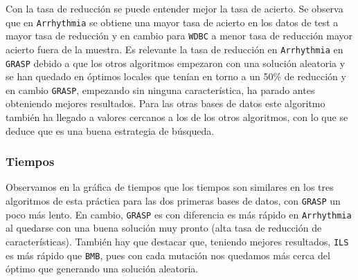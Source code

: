 \documentclass[11pt,leqno]{article}
\begin{document}
Con la tasa de reducción se puede entender mejor la tasa de acierto. Se observa que en \texttt{Arrhythmia} se obtiene una mayor tasa de acierto en los datos de test a mayor tasa de reducción y en cambio para \texttt{WDBC} a menor tasa de reducción mayor acierto fuera de la muestra. Es relevante la tasa de reducción en \texttt{Arrhythmia} en \texttt{GRASP} debido a que los otros algoritmos empezaron con una solución aleatoria y se han quedado en óptimos locales que tenían en torno a un 50$\%$ de reducción y en cambio \texttt{GRASP}, empezando sin ninguna característica, ha parado antes obteniendo mejores resultados. Para las otras bases de datos este algoritmo también ha llegado a valores cercanos a los de los otros algoritmos, con lo que se deduce que es una buena estrategia de búsqueda. 

\subsubsection{Tiempos}

\pgfplotstabletranspose[input colnames to=DB,columns={TW,TL,TA}]\dataTimes{\dataGlobal}

\begin{center}
\dataTimes
\end{center}


\begin{center}
\end{center}

Observamos en la gráfica de tiempos que los tiempos son similares en los tres algoritmos de esta práctica para las dos primeras bases de datos, con \texttt{GRASP} un poco más lento. En cambio, \texttt{GRASP} es con diferencia es más rápido en \texttt{Arrhythmia} al quedarse con una buena solución muy pronto (alta tasa de reducción de características). También hay que destacar que, teniendo mejores resultados, \texttt{ILS} es más rápido que \texttt{BMB}, pues con cada mutación nos quedamos más cerca del óptimo que generando una solución aleatoria.
\end{document}
